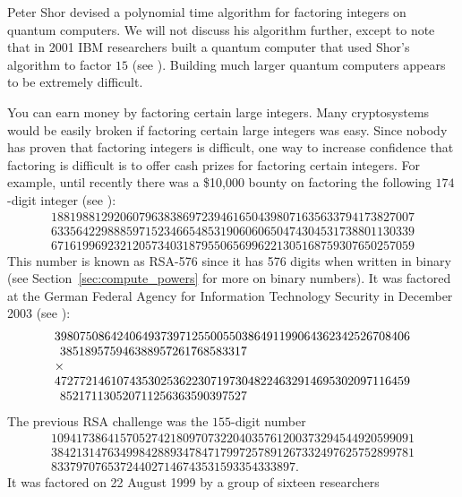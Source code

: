 Peter Shor \cite{shor} devised a polynomial time algorithm
for factoring integers on quantum computers. We will not discuss his
algorithm further, except to note that in 2001 IBM researchers
built a quantum computer that used Shor's algorithm to factor $15$ (see
\cite{quantum15, ibm:shor15}).  Building much larger quantum
computers appears to be extremely difficult.

You can earn money by factoring certain large integers.  Many
cryptosystems would be easily broken if factoring certain large
integers was easy.  Since nobody has proven that factoring integers
is difficult, one way to increase confidence that factoring is
difficult is to offer cash prizes for factoring certain integers.  For
example, until recently there was a \$10,000 bounty on factoring the
following $174$-digit integer (see \cite{rsa:challenge}):
$$
\begin{array}{l}
1881988129206079638386972394616504398071635633794173827007\\
6335642298885971523466548531906060650474304531738801130339\\
6716199692321205734031879550656996221305168759307650257059
\end{array}
$$
This number is known as RSA-576 since it has 576
digits when written in binary (see Section~\ref{sec:compute_powers}
for more on binary numbers).  It was factored at the German
Federal Agency for Information Technology Security in December
2003 (see \cite{factor576}):
$$
\begin{array}{l}
  398075086424064937397125500550386491199064362342526708406\\
  \hspace{1ex}385189575946388957261768583317\\
    \times\\
  472772146107435302536223071973048224632914695302097116459\\
    \hspace{1ex}852171130520711256363590397527
  \end{array}
$$
The previous RSA challenge was the $155$-digit number
$$
\begin{array}{l}
1094173864157052742180970732204035761200373294544920599091\\
3842131476349984288934784717997257891267332497625752899781\\
833797076537244027146743531593354333897.
\end{array}$$
It was factored on 22 August 1999 by a group of sixteen researchers
